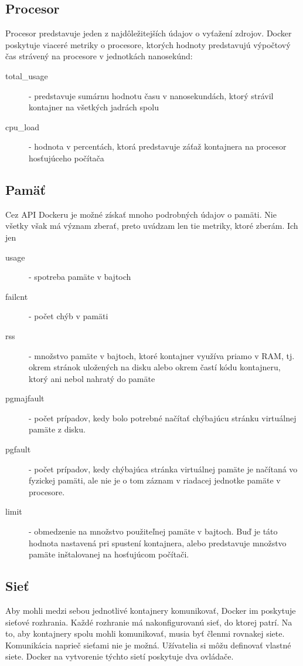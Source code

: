 \documentclass[12pt,twoside,color,cover,table]{fithesis3}
\begin{document}
\subsection{Procesor}
Procesor predstavuje jeden z najdôležitejších údajov o vyťažení zdrojov. Docker poskytuje viaceré metriky o procesore, ktorých hodnoty 
predstavujú výpočtový čas strávený na procesore v jednotkách nanosekúnd: 
\begin{description}
\item[total\_usage] - predstavuje sumárnu hodnotu času v nanosekundách, ktorý strávil kontajner na všetkých jadrách spolu
\item[cpu\_load] - hodnota v percentách, ktorá predstavuje záťaž kontajnera na procesor hosťujúceho počítača
\end{description}

\subsection{Pamäť}
Cez API Dockeru je možné získať mnoho podrobných údajov o pamäti. Nie všetky však má význam zberať, preto uvádzam len tie metriky, ktoré zberám. Ich jen
\begin{description}
\item[usage] - spotreba pamäte v bajtoch
\item[failcnt] - počet chýb v pamäti
\item[rss] - množstvo pamäte v bajtoch, ktoré kontajner využíva priamo v RAM, tj. okrem stránok uložených na disku alebo okrem častí kódu kontajneru, ktorý ani nebol nahratý do pamäte
\item[pgmajfault] - počet prípadov, kedy bolo potrebné načítať chýbajúcu stránku virtuálnej pamäte z disku.
\item[pgfault] - počet prípadov, kedy chýbajúca stránka virtuálnej pamäte je načítaná vo fyzickej pamäti, ale nie je o tom záznam v riadacej jednotke pamäte v procesore.
\item[limit] - obmedzenie na množstvo použiteľnej pamäte v bajtoch. Buď je táto hodnota nastavená pri spustení kontajnera, alebo predstavuje množstvo pamäte inštalovanej na hosťujúcom počítači.
\end{description}

\subsection{Sieť}
Aby mohli medzi sebou jednotlivé kontajnery komunikovať, Docker im poskytuje sieťové rozhrania. Každé rozhranie má nakonfigurovanú sieť,
do ktorej patrí. Na to, aby kontajnery spolu mohli komunikovať, musia byť členmi rovnakej siete. Komunikácia naprieč sieťami nie je možná.
Užívatelia si môžu definovať vlastné siete. Docker na vytvorenie týchto sietí poskytuje dva ovládače.
\end{document}
